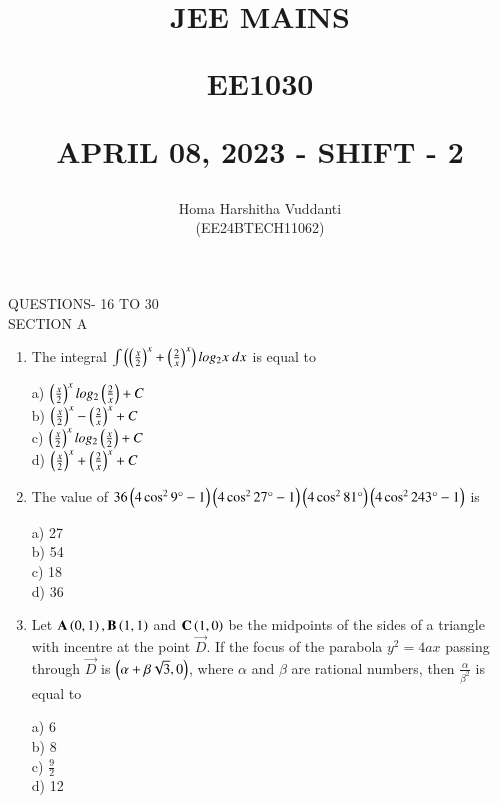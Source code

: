 \documentclass[journal]{IEEEtran}
\begin{document}


\title{
JEE MAINS

\large{EE1030}

APRIL 08, 2023 - SHIFT - 2
}
\author{Homa Harshitha Vuddanti

(EE24BTECH11062)
}	

\maketitle

\bigskip

\renewcommand{\thefigure}{\theenumi}
\renewcommand{\thetable}{\theenumi}
QUESTIONS- 16 TO 30\\
SECTION A
\begin{enumerate}
   
\item The integral $\int \left(\left(\frac{x}{2}\right)^x+\left(\frac{2}{x}\right)^x\right)log_2 x\ dx$ is equal to 
\begin{multicols}{4}
    a) $\left(\frac{x}{2}\right)^x log_2\left(\frac{2}{x}\right)+C$\\
    b) $\left(\frac{x}{2}\right)^x -\left(\frac{2}{x}\right)^x+C$\\
    c) $\left(\frac{x}{2}\right)^x log_2\left(\frac{x}{2}\right)+C$\\
    d)  $\left(\frac{x}{2}\right)^x +\left(\frac{2}{x}\right)^x+C$
\end{multicols}
 \item The value of $36\left(4\cos^2 9\degree -1\right)\left(4\cos^2 27\degree -1\right)\left(4\cos^2 81\degree\right)\left(4\cos^2 243\degree -1\right)$ is
 \begin{multicols}{4}
     a) 27\\
     b) 54\\
     c) 18\\
     d) 36
 \end{multicols}
 
 \item Let $\mathbf{A}\left(0,1\right), \mathbf{B}\left(1,1\right)$ and $\mathbf{C}\left(1,0\right)$ be the midpoints of the sides of a triangle with incentre at the point $\vec{D}$. If the focus of the parabola $y^2=4ax$ passing through $\vec{D}$ is $\left(\alpha +\beta \sqrt{3},0\right)$, where $\alpha$ and $\beta$ are rational numbers, then $\frac{\alpha}{\beta^2}$ is equal to
 \begin{multicols}{4}
    a) 6\\
    b) 8\\
    c) $\frac{9}{2}$\\
    d) 12
 \end{multicols}
 

\end{enumerate}
\end{document}
